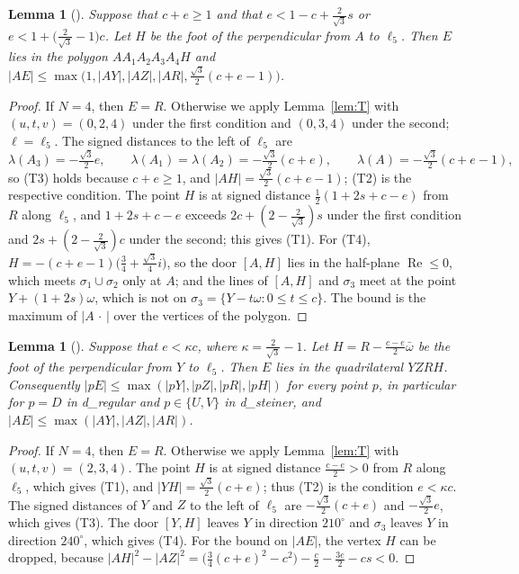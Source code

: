 \documentclass[11pt]{amsart}
\newtheorem{lemma}[theorem]{Lemma}
\theoremstyle{definition}
\theoremstyle{remark}
\numberwithin{equation}{section}
\begin{document}
\begin{lemma}[{\cite[Lemmas~29 and~30]{KHSHGW}}]\label{lem:L12}
Suppose that $c+e\ge1$ and that $e<1-c+\frac2{\sqrt3}s$ or $e<1+\bigl(\frac2{\sqrt3}-1\bigr)c$. Let $H$ be the foot of the perpendicular from $A$ to $\ell_5$. Then $E$ lies in the polygon $AA_1A_2A_3A_4H$ and $|AE|\le\max\bigl(1,|AY|,|AZ|,|AR|,\frac{\sqrt3}2(c+e-1)\bigr)$.
\end{lemma}

\begin{proof}
If $N=4$, then $E=R$. Otherwise we apply Lemma~\ref{lem:T} with $(u,t,v)=(0,2,4)$ under the first condition and $(0,3,4)$ under the second; $\ell=\ell_5$. The signed distances to the left of $\ell_5$ are
\[
\lambda(A_3)=-\tfrac{\sqrt3}2e,\qquad\lambda(A_1)=\lambda(A_2)=-\tfrac{\sqrt3}2(c+e),\qquad\lambda(A)=-\tfrac{\sqrt3}2(c+e-1),
\]
so (T3) holds because $c+e\ge1$, and $|AH|=\frac{\sqrt3}2(c+e-1)$; (T2) is the respective condition. The point $H$ is at signed distance $\frac12(1+2s+c-e)$ from $R$ along $\ell_5$, and $1+2s+c-e$ exceeds $2c+(2-\frac2{\sqrt3})s$ under the first condition and $2s+(2-\frac2{\sqrt3})c$ under the second; this gives (T1). For (T4), $H=-(c+e-1)\bigl(\frac34+\frac{\sqrt3}4i\bigr)$, so the door $[A,H]$ lies in the half-plane $\operatorname{Re}\le0$, which meets $\sigma_1\cup\sigma_2$ only at $A$; and the lines of $[A,H]$ and $\sigma_3$ meet at the point $Y+(1+2s)\omega$, which is not on $\sigma_3=\{Y-t\omega:0\le t\le c\}$. The bound is the maximum of $|A\,\cdot\,|$ over the vertices of the polygon.
\end{proof}

\begin{lemma}[{\cite[Lemma~33]{KHSHGW}}]\label{lem:L5}
Suppose that $e<\kappa c$, where $\kappa=\frac2{\sqrt3}-1$. Let $H=R-\frac{c-e}2\bar\omega$ be the foot of the perpendicular from $Y$ to $\ell_5$. Then $E$ lies in the quadrilateral $YZRH$. Consequently $|pE|\le\max(|pY|,|pZ|,|pR|,|pH|)$ for every point $p$, in particular for $p=D$ in d\_regular and $p\in\{U,V\}$ in d\_steiner, and $|AE|\le\max(|AY|,|AZ|,|AR|)$.
\end{lemma}

\begin{proof}
If $N=4$, then $E=R$. Otherwise we apply Lemma~\ref{lem:T} with $(u,t,v)=(2,3,4)$. The point $H$ is at signed distance $\frac{c-e}2>0$ from $R$ along $\ell_5$, which gives (T1), and $|YH|=\frac{\sqrt3}2(c+e)$; thus (T2) is the condition $e<\kappa c$. The signed distances of $Y$ and $Z$ to the left of $\ell_5$ are $-\frac{\sqrt3}2(c+e)$ and $-\frac{\sqrt3}2e$, which gives (T3). The door $[Y,H]$ leaves $Y$ in direction $210^\circ$ and $\sigma_3$ leaves $Y$ in direction $240^\circ$, which gives (T4). For the bound on $|AE|$, the vertex $H$ can be dropped, because $|AH|^2-|AZ|^2=\bigl(\frac34(c+e)^2-c^2\bigr)-\frac c2-\frac{3e}2-cs<0$.
\end{proof}
\end{document}
